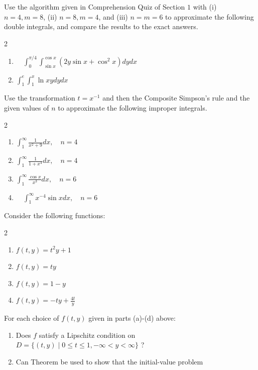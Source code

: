 

\begin{posttest}[\textcolor{red}{End of Module 6 Quiz}]
\item Use the algorithm given in Comprehension Quiz of Section $1$ with (i) $n=4, m=8$, (ii) $n=8, m=4$, and (iii) $n=m=6$ to approximate the following double integrals, and compare the results to the exact answers.\\
\begin{multicols}{2}
\begin{enumerate}[label=(\alph*)]
\item $\quad \int_{0}^{\pi / 4} \int_{\sin x}^{\cos x}\left(2 y \sin x+\cos ^{2} x\right) d y d x$
\item $\int_{1}^{e} \int_{1}^{x} \ln x y d y d x$
\end{enumerate}
\end{multicols}
\item Use the transformation $t=x^{-1}$ and then the Composite Simpson's rule and the given values of $n$ to approximate the following improper integrals.
\begin{multicols}{2}
\begin{enumerate}[label=(\alph*)]
\item $\int_{1}^{\infty} \frac{1}{x^{2}+9} d x, \quad n=4$\\
\item $\int_{1}^{\infty} \frac{1}{1+x^{4}} d x, \quad n=4$
\item $\int_{1}^{\infty} \frac{\cos x}{x^{3}} d x, \quad n=6$\\
\item $\quad \int_{1}^{\infty} x^{-4} \sin x d x, \quad n=6$ 
\end{enumerate}
\end{multicols}

\item Consider the following functions: 
\begin{multicols}{2}
\begin{enumerate}[label=(\alph*)]
\item $f(t, y)=t^{2} y+1$
\item $f(t, y)=t y$
\item $f(t, y)=1-y$
\item $f(t, y)=-t y+\frac{4 t}{y}$
\end{enumerate}
\end{multicols}

For each choice of $f(t, y)$ given in parts (a)-(d) above:
\begin{enumerate}[label=\roman*.]
\item Does $f$ satisfy a Lipschitz condition on $D=\{(t, y) \mid 0 \leq t \leq 1,-\infty<y<\infty\}$ ?
\item Can Theorem \label{thm:wellposedcond} be used to show that the initial-value problem



\end{enumerate}
\end{posttest}
